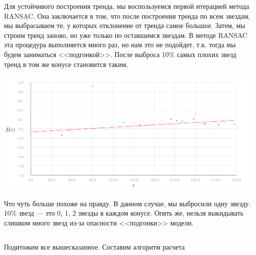 \documentclass[14pt]{article}
\begin{document}
                
                Для устойчивого построения тренда, мы воспользуемся первой итерацией метода RANSAC. Она заключается в том, что после построения тренда по всем звездам, мы выбрасываем те, у которых отклонение от тренда самое большое. Затем, мы строим тренд заново, но уже только по оставшимся звездам. В методе RANSAC эта процедура выполняется много раз, но нам это не подойдет, т.к. тогда мы будем заниматься <<подгонкой>>. После выброса 10\% самых плохих звезд тренд в том же конусе становится таким,
                \begin{center}
                    \includegraphics[scale=0.4]{ransac.png}
                \end{center} 
                
                Что чуть больше похоже на правду. В данном случае, мы выбросили одну звезду. 10\% звезд --- это 0, 1, 2 звезды в каждом конусе. Опять же, нельзя выкидывать слишком много звезд из-за опасности <<подгонки>> модели.     
                
        \subsection{}
            Подитожим все вышесказанное. Составим алгоритм расчета             
                
    

    
\end{document}
